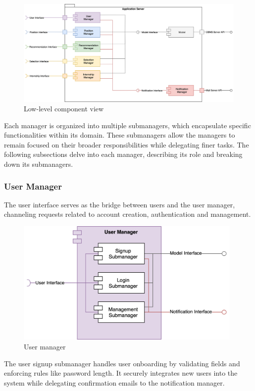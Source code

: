 \begin{figure}[ht]
    \centering
    \includegraphics[width=16cm]{images/component-view/low-level.png}
    \caption{Low-level component view}
\end{figure}

Each manager is organized into multiple submanagers, which encapsulate specific functionalities within its domain.
These submanagers allow the managers to remain focused on their broader responsibilities while delegating finer tasks.
The following subsections delve into each manager, describing its role and breaking down its submanagers.

\subsubsection{User Manager}
The user interface serves as the bridge between users and the user manager, channeling requests related to account creation, authentication and management.

\begin{figure}[ht]
    \centering
    \includegraphics[width=11cm]{images/managers/user.png}
    \caption{User manager}
\end{figure}

The user signup submanager handles user onboarding by validating fields and enforcing rules like password length.
It securely integrates new users into the system while delegating confirmation emails to the notification manager.

